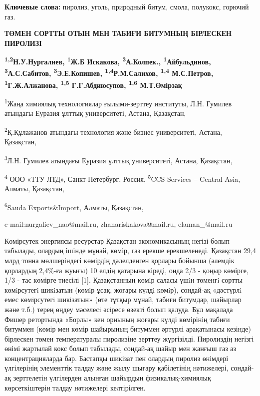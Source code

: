 {\bfseries Ключевые слова:} пиролиз, уголь, природный битум, смола,
полукокс, горючий газ.

\begin{center}
{\large\bfseries ТӨМЕН СОРТТЫ ОТЫН МЕН ТАБИҒИ БИТУМНЫҢ БІРЛЕСКЕН ПИРОЛИЗІ}

{\bfseries \textsuperscript{1,2}Н.У.Нургалиев, \textsuperscript{1}Ж.Б
Искакова, \textsuperscript{3}А.Колпек., \textsuperscript{1}Айбульдинов, \textsuperscript{3}А.С.Сабитов, \textsuperscript{3}Э.Е.Копишев, \textsuperscript{1,4}Р.М.Салихов, \textsuperscript{1,4} М.С.Петров, \textsuperscript{1}Г.Ж.Алжанова, \textsuperscript{1,5} Г.Г.Абдиюсупов, \textsuperscript{1,6}
М.Т.Өмірзақ}

\textsuperscript{1}Жаңа химиялық технологиялар ғылыми-зерттеу институты,
Л.Н. Гумилев атындағы Еуразия ұлттық университеті, Астана, Қазақстан,

\textsuperscript{2}Қ.Құлажанов атындағы технология және бизнес
университеті, Астана, Қазақстан,

\textsuperscript{3}Л.Н. Гумилев атындағы Еуразия ұлттық университеті,
Астана, Қазақстан,

\textsuperscript{4} ООО «ТТУ ЛТД», Санкт-Петербург, Россия,
\textsuperscript{5}CCS Services -- Central Asia, Алматы, Қазақстан,

\textsuperscript{6}Sauda Exports\&Import, Алматы, Қазақстан,

e-mail:nurgaliev\_nao@mail.ru, zhanariskakova@mail.ru, elaman\_@mail.ru
\end{center}

Көмірсутек энергиясы ресурстар Қазақстан экономикасының негізі болып
табылады, олардың ішінде мұнай, көмір, газ ерекше ерекшеленеді.
Қазақстан 29,4 млрд тонна мөлшеріндегі көмірдің дәлелденген қорлары
бойынша (әлемдік қорлардың 2,4\%-ға жуығы) 10 елдің қатарына кіреді,
онда 2/3 - қоңыр көмірге, 1/3 - тас көмірге тиесілі {[}1{]}.
Қазақстанның көмiр саласы үшiн төменгi сортты көмiрсутегi шикiзатын
(көмiр ұсақ, жоғары күлдi көмiр), сондай-ақ «дәстүрлi емес көмiрсутегi
шикiзатын» (өте тұтқыр мұнай, табиғи битумдар, шайырлар және т.б.) терең
өңдеу мәселесi әсiресе өзектi болып қалуда. Бұл мақалада Фишер
ретортында «Борлы» кен орнының жоғары күлді көмірінің табиғи битуммен
(көмір мен көмір шайырының битуммен әртүрлі арақатынасы кезінде)
бірлескен төмен температуралы пиролизіне зерттеу жүргізілді. Пиролиздің
негізгі өнімі жартылай кокс болып табылады, сондай-ақ шайыр мен жанғыш
газ аз концентрацияларда бар. Бастапқы шикізат пен олардың пиролиз
өнімдері үлгілерінің элементтік талдау және жылу шығару қабілетінің
нәтижелері, сондай-ақ зерттелетін үлгілерден алынған шайырдың
физикалық-химиялық көрсеткіштерін талдау нәтижелері келтірілген.

